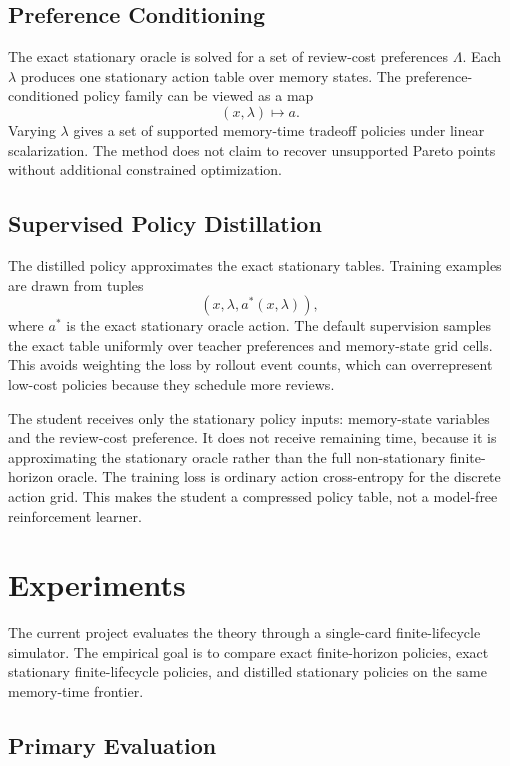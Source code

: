 \documentclass[11pt]{article}
\begin{document}
\subsection{Preference Conditioning}

The exact stationary oracle is solved for a set of review-cost preferences \(\Lambda\). Each \(\lambda\) produces one stationary action table over memory states. The preference-conditioned policy family can be viewed as a map
\[
(x,\lambda)\mapsto a.
\]
Varying \(\lambda\) gives a set of supported memory-time tradeoff policies under linear scalarization. The method does not claim to recover unsupported Pareto points without additional constrained optimization.

\subsection{Supervised Policy Distillation}

The distilled policy approximates the exact stationary tables. Training examples are drawn from tuples
\[
(x,\lambda,a^*(x,\lambda)),
\]
where \(a^*\) is the exact stationary oracle action. The default supervision samples the exact table uniformly over teacher preferences and memory-state grid cells. This avoids weighting the loss by rollout event counts, which can overrepresent low-cost policies because they schedule more reviews.

The student receives only the stationary policy inputs: memory-state variables and the review-cost preference. It does not receive remaining time, because it is approximating the stationary oracle rather than the full non-stationary finite-horizon oracle. The training loss is ordinary action cross-entropy for the discrete action grid. This makes the student a compressed policy table, not a model-free reinforcement learner.

\section{Experiments}

The current project evaluates the theory through a single-card finite-lifecycle simulator. The empirical goal is to compare exact finite-horizon policies, exact stationary finite-lifecycle policies, and distilled stationary policies on the same memory-time frontier.

\subsection{Primary Evaluation}
\end{document}

